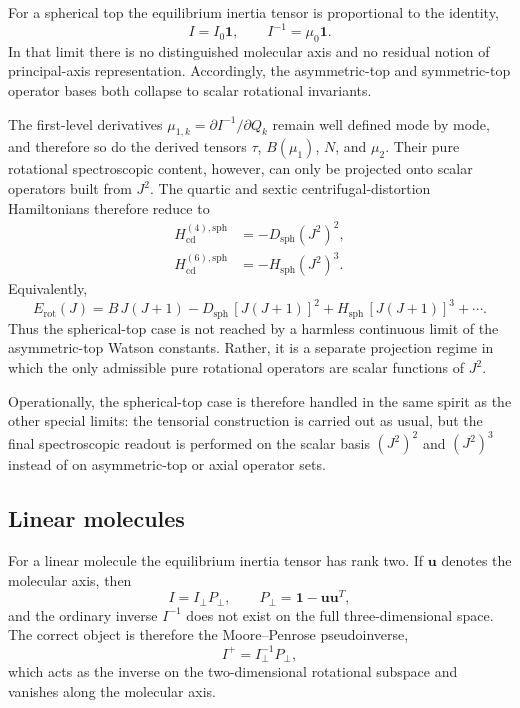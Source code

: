 \documentclass[aip,jcp,reprint,floatfix]{revtex4-2}
\begin{document}
For a spherical top the equilibrium inertia tensor is proportional to the
identity,
\begin{equation}
I = I_0 \mathbf 1,
\qquad
I^{-1} = \mu_0 \mathbf 1.
\end{equation}
In that limit there is no distinguished molecular axis and no residual notion
of principal-axis representation. Accordingly, the asymmetric-top and
symmetric-top operator bases both collapse to scalar rotational invariants.

The first-level derivatives $\mu_{1,k}=\partial I^{-1}/\partial Q_k$ remain
well defined mode by mode, and therefore so do the derived tensors $\tau$,
$B(\mu_1)$, $N$, and $\mu_2$. Their pure rotational spectroscopic content,
however, can only be projected onto scalar operators built from $J^2$. The
quartic and sextic centrifugal-distortion Hamiltonians therefore reduce to
\begin{align}
H_{\mathrm{cd}}^{(4),\mathrm{sph}} &= -D_{\mathrm{sph}} \left(J^2\right)^2, \\
H_{\mathrm{cd}}^{(6),\mathrm{sph}} &= -H_{\mathrm{sph}} \left(J^2\right)^3.
\end{align}
Equivalently,
\begin{equation}
E_{\mathrm{rot}}(J)
=
B\,J(J+1)
-D_{\mathrm{sph}}\,[J(J+1)]^2
+H_{\mathrm{sph}}\,[J(J+1)]^3+\cdots .
\end{equation}
Thus the spherical-top case is not reached by a harmless continuous limit of
the asymmetric-top Watson constants. Rather, it is a separate projection
regime in which the only admissible pure rotational operators are scalar
functions of $J^2$.

Operationally, the spherical-top case is therefore handled in the same spirit
as the other special limits: the tensorial construction is carried out as
usual, but the final spectroscopic readout is performed on the scalar basis
$(J^2)^2$ and $(J^2)^3$ instead of on asymmetric-top or axial operator sets.

\subsection{Linear molecules}

For a linear molecule the equilibrium inertia tensor has rank two. If
$\mathbf u$ denotes the molecular axis, then
\begin{equation}
I = I_{\perp} P_{\perp},
\qquad
P_{\perp} = \mathbf 1 - \mathbf u\mathbf u^T,
\end{equation}
and the ordinary inverse $I^{-1}$ does not exist on the full
three-dimensional space. The correct object is therefore the Moore--Penrose
pseudoinverse,
\begin{equation}
I^+ = I_{\perp}^{-1} P_{\perp},
\end{equation}
which acts as the inverse on the two-dimensional rotational subspace and
vanishes along the molecular axis.
\end{document}
